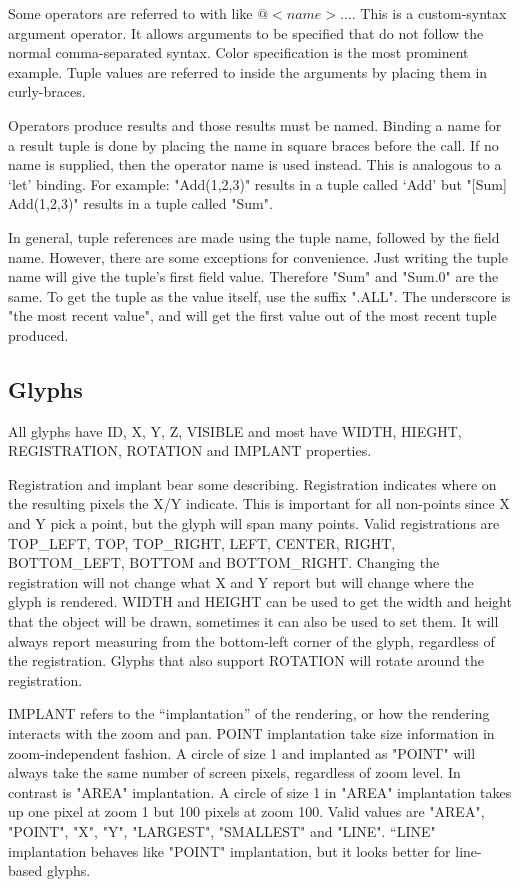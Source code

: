 \documentclass{article}
\begin{document}
Some operators are referred to with like $@<name>{...}$.  This is a custom-syntax argument operator.
It allows arguments to be specified that do not follow the normal comma-separated syntax.  
Color specification is the most prominent example.  
Tuple values are referred to inside the arguments by placing them in curly-braces.

Operators produce results and those results must be named.
Binding a name for a result tuple is done by placing the name in square braces before the call.
If no name is supplied, then the operator name is used instead. 
This is analogous to a `let' binding.
For example: "Add(1,2,3)" results in a tuple called `Add' but "[Sum] Add(1,2,3)" results in a tuple called "Sum".

In general, tuple references are made using the tuple name, followed by the field name.
However, there are some exceptions for convenience.
Just writing the tuple name will give the tuple's first field value.
Therefore "Sum" and "Sum.0" are the same.
To get the tuple as the value itself, use the suffix ".ALL".
The underscore is "the most recent value", and will get the first value out of the most recent tuple produced.


\subsection{Glyphs}
All glyphs have ID, X, Y, Z, VISIBLE and most have  WIDTH, HIEGHT, REGISTRATION, ROTATION and IMPLANT properties.

Registration and implant bear some describing.
Registration indicates where on the resulting pixels the X/Y indicate.  
This is important for all non-points since X and Y pick a point, but the glyph will span many points.
Valid registrations are TOP\_LEFT, TOP, TOP\_RIGHT, LEFT, CENTER, RIGHT, BOTTOM\_LEFT, BOTTOM and BOTTOM\_RIGHT.  
Changing the registration will not change what X and Y report but will change where the glyph is rendered. 
WIDTH and HEIGHT can be used to get the width and height that the object will be drawn, sometimes it can also be used to set them.  
It will always report measuring from the bottom-left corner of the glyph, regardless of the registration.
Glyphs that also support ROTATION will rotate around the registration.

IMPLANT refers to the ``implantation'' of the rendering, or how the rendering interacts with the zoom and pan.
POINT implantation take size information in zoom-independent fashion.  
A circle of size 1 and implanted as "POINT" will always take the same number of screen pixels, regardless of zoom level.
In contrast is "AREA" implantation.   A circle of size 1 in "AREA" implantation takes up one pixel at zoom 1 but 100 pixels at zoom 100.
Valid values are "AREA", "POINT", "X", "Y", "LARGEST", "SMALLEST" and "LINE".  
``LINE" implantation behaves like "POINT" implantation, but it looks better for line-based glyphs.
\end{document}
